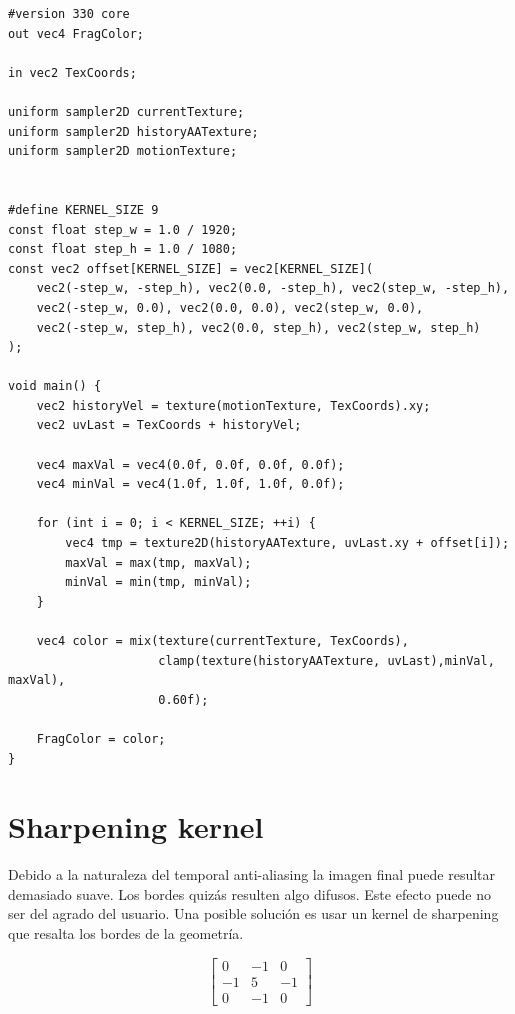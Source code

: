 \documentclass[withindex, glossary]{cam-thesis}
\begin{document}
\begin{verbatim}
#version 330 core
out vec4 FragColor;

in vec2 TexCoords;

uniform sampler2D currentTexture;
uniform sampler2D historyAATexture;
uniform sampler2D motionTexture;


#define KERNEL_SIZE 9
const float step_w = 1.0 / 1920;
const float step_h = 1.0 / 1080;
const vec2 offset[KERNEL_SIZE] = vec2[KERNEL_SIZE](
    vec2(-step_w, -step_h), vec2(0.0, -step_h), vec2(step_w, -step_h),
    vec2(-step_w, 0.0), vec2(0.0, 0.0), vec2(step_w, 0.0),
    vec2(-step_w, step_h), vec2(0.0, step_h), vec2(step_w, step_h)
);

void main() {
    vec2 historyVel = texture(motionTexture, TexCoords).xy;
    vec2 uvLast = TexCoords + historyVel;

    vec4 maxVal = vec4(0.0f, 0.0f, 0.0f, 0.0f);
    vec4 minVal = vec4(1.0f, 1.0f, 1.0f, 0.0f);

    for (int i = 0; i < KERNEL_SIZE; ++i) {
        vec4 tmp = texture2D(historyAATexture, uvLast.xy + offset[i]);
        maxVal = max(tmp, maxVal);
        minVal = min(tmp, minVal);
    }

    vec4 color = mix(texture(currentTexture, TexCoords),
                     clamp(texture(historyAATexture, uvLast),minVal, maxVal),
                     0.60f);

    FragColor = color;
}
\end{verbatim}

\section{Sharpening kernel}

Debido a la naturaleza del temporal anti-aliasing la imagen final puede resultar demasiado suave. Los bordes quizás resulten algo difusos. Este efecto puede no ser del agrado del usuario. Una posible solución es usar un kernel de sharpening que resalta los bordes de la geometría.

\[
    \begin{bmatrix}
        0 & -1 & 0 \\
        -1 & 5 & -1 \\
        0 & -1 & 0
    \end{bmatrix}
\]
\end{document}
